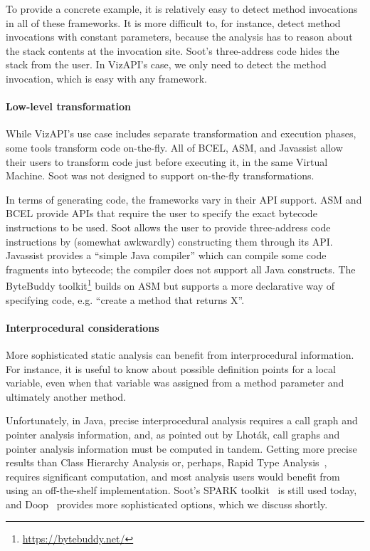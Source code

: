 To provide a concrete example, it is relatively easy to detect method
invocations in all of these frameworks. It is more difficult to, for
instance, detect method invocations with constant parameters, because
the analysis has to reason about the stack contents at the invocation
site. Soot's three-address code hides the stack from the user. In VizAPI's
case, we only need to detect the method invocation, which is easy
with any framework.

\paragraph{Low-level transformation}
While VizAPI's use case includes separate transformation and execution
phases, some tools transform code on-the-fly. All of BCEL, ASM,
and Javassist allow their users to transform code just before executing it,
in the same Virtual Machine. Soot was not designed to support on-the-fly
transformations.

In terms of generating code, the frameworks vary in their API support.
ASM and BCEL provide APIs that require the user to specify the exact
bytecode instructions to be used. Soot allows the user to provide
three-address code instructions by (somewhat awkwardly) constructing
them through its API. Javassist provides a ``simple Java compiler''
which can compile some code fragments into bytecode; the compiler does
not support all Java constructs.  The ByteBuddy
toolkit\footnote{\url{https://bytebuddy.net/}} builds on ASM but
supports a more declarative way of specifying code, e.g. ``create a
method that returns X''.

\paragraph{Interprocedural considerations}
More sophisticated static analysis can benefit from interprocedural
information. For instance, it is useful to know about possible
definition points for a local variable, even when that variable
was assigned from a method parameter and ultimately another method.

Unfortunately, in Java, precise interprocedural analysis requires a
call graph and pointer analysis information, and, as pointed out by
Lhot\'ak, call graphs and pointer analysis information must be
computed in tandem. Getting more precise results than Class Hierarchy
Analysis or, perhaps, Rapid Type
Analysis~\cite{bacon96:_fast_static_analy_c_virtual_funct_calls},
requires significant computation, and most analysis users would
benefit from using an off-the-shelf implementation. Soot's SPARK
toolkit~\cite{lhot02} is still used today, and
Doop~\cite{bravenboer09:_stric_declar_specif_sophis_point_analy}
provides more sophisticated options, which we discuss shortly.

